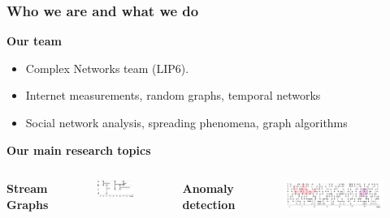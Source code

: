 \documentclass{beamer}
\begin{document}
\begin{frame}
\frametitle{Who we are and what we do}

\textbf{Our team}

\begin{itemize}
\item Complex Networks team (LIP6).
\item Internet measurements, random graphs, temporal networks
\item Social network analysis, spreading phenomena, graph algorithms
\end{itemize}

\bigskip

\textbf{Our main research topics}

\bigskip

\begin{columns}[t]

\textbf{Stream Graphs}

\begin{figure}
\includegraphics[width=0.8\linewidth]{./figures/stream_graph}
\end{figure}

\textbf{Anomaly detection}

\begin{figure}
\includegraphics[width=\linewidth]{./figures/anomalie_detection}
\end{figure}

\end{columns}


\end{frame}
\end{document}
